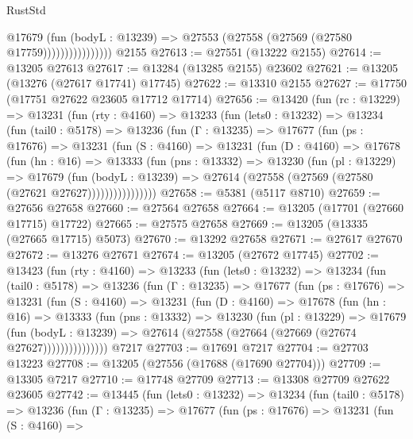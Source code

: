 \begin{lexlean}{RustStd}
\begin{coremodule}
                          @17679
                            (fun (bodyL : @13239) =>
                            @27553 (@27558 (@27569 (@27580 @17759))))))))))))))))
    @2155
@27613 := @27551 (@13222 @2155)
@27614 := @13205 @27613
@27617 := @13284 (@13285 @2155) @23602
@27621 := @13205 (@13276 (@27617 @17741) @17745)
@27622 := @13310 @2155
@27627 := @17750 (@17751 @27622 @23605 @17712 @17714)
@27656 := @13420
    (fun (rc : @13229) =>
    @13231
      (fun (rty : @4160) =>
      @13233
        (fun (lets0 : @13232) =>
        @13234
          (fun (tail0 : @5178) =>
          @13236
            (fun (Γ : @13235) =>
            @17677
              (fun (ps : @17676) =>
              @13231
                (fun (S : @4160) =>
                @13231
                  (fun (D : @4160) =>
                  @17678
                    (fun (hn : @16) =>
                    @13333
                      (fun (pns : @13332) =>
                      @13230
                        (fun (pl : @13229) =>
                        @17679
                          (fun (bodyL : @13239) =>
                          @27614 (@27558 (@27569 (@27580 (@27621 @27627))))))))))))))))
@27658 := @5381 (@5117 @8710)
@27659 := @27656 @27658
@27660 := @27564 @27658
@27664 := @13205 (@17701 (@27660 @17715) @17722)
@27665 := @27575 @27658
@27669 := @13205 (@13335 (@27665 @17715) @5073)
@27670 := @13292 @27658
@27671 := @27617 @27670
@27672 := @13276 @27671
@27674 := @13205 (@27672 @17745)
@27702 := @13423
    (fun (rty : @4160) =>
    @13233
      (fun (lets0 : @13232) =>
      @13234
        (fun (tail0 : @5178) =>
        @13236
          (fun (Γ : @13235) =>
          @17677
            (fun (ps : @17676) =>
            @13231
              (fun (S : @4160) =>
              @13231
                (fun (D : @4160) =>
                @17678
                  (fun (hn : @16) =>
                  @13333
                    (fun (pns : @13332) =>
                    @13230
                      (fun (pl : @13229) =>
                      @17679
                        (fun (bodyL : @13239) =>
                        @27614 (@27558 (@27664 (@27669 (@27674 @27627)))))))))))))))
    @7217
@27703 := @17691 @7217
@27704 := @27703 @13223
@27708 := @13205 (@27556 (@17688 (@17690 @27704)))
@27709 := @13305 @7217
@27710 := @17748 @27709
@27713 := @13308 @27709 @27622 @23605
@27742 := @13445
    (fun (lets0 : @13232) =>
    @13234
      (fun (tail0 : @5178) =>
      @13236
        (fun (Γ : @13235) =>
        @17677
          (fun (ps : @17676) =>
          @13231
            (fun (S : @4160) =>

\end{coremodule}
\end{lexlean}
